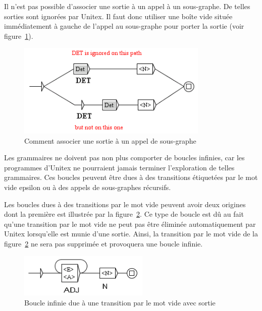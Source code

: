 \bigskip
\noindent Il n’est pas possible d’associer une sortie à un appel à un sous-graphe. De telles sorties
sont ignorées par Unitex. Il faut donc utiliser une boîte vide située immédiatement à gauche
de l’appel au sous-graphe pour porter la sortie (voir figure~\ref{fig-subgraph-output}).

\bigskip
\begin{figure}[!ht]
\begin{center}
\includegraphics[width=9.1cm]{resources/img/fig6-7.png}
\caption{Comment associer une sortie à un appel de sous-graphe\label{fig-subgraph-output}}
\end{center}
\end{figure}

\noindent Les grammaires ne doivent pas non plus comporter de boucles infinies, car les programmes
d’Unitex ne pourraient jamais terminer l’exploration de telles grammaires.
Ces boucles peuvent être dues à des transitions étiquetées par le mot vide epsilon ou à des
appels de sous-graphes récursifs.


\bigskip
\noindent Les boucles dues à des transitions par le mot vide peuvent avoir deux origines dont la
première est illustrée par la figure~\ref{fig-epsilon-output-loop}.
Ce type de boucle est dû au fait qu’une transition par le mot vide ne peut pas être éliminée
automatiquement par Unitex lorsqu’elle est munie d’une sortie. Ainsi, la transition par
le mot vide de la figure~\ref{fig-epsilon-output-loop} ne sera pas supprimée et provoquera une
boucle infinie.

\bigskip
\begin{figure}[!ht]
\begin{center}
\includegraphics[width=6.2cm]{resources/img/fig6-8.png}
\caption{Boucle infinie due à une transition par le mot vide avec sortie\label{fig-epsilon-output-loop}}
\end{center}
\end{figure}

